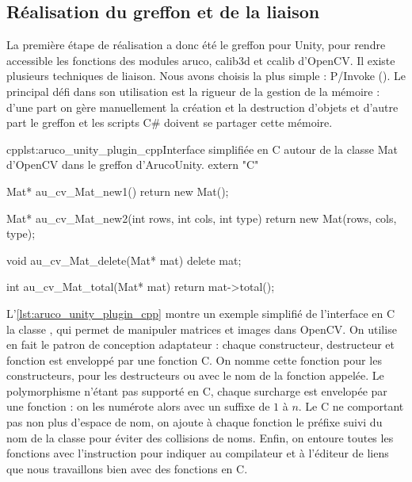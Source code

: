 \subsection{Réalisation du greffon et de la liaison}
La première étape de réalisation a donc été le greffon pour Unity, pour rendre accessible les fonctions des modules aruco, calib3d et ccalib d'OpenCV. Il existe plusieurs techniques de liaison. Nous avons choisis la plus simple : P/Invoke (). Le principal défi dans son utilisation est la rigueur de la gestion de la mémoire : d'une part on gère manuellement la création et la destruction d'objets et d'autre part le greffon et les scripts C\# doivent se partager cette mémoire.

\begin{listingETS}{cpp}{lst:aruco_unity_plugin_cpp}{Interface simplifiée en C autour de la classe Mat d'OpenCV dans le greffon d'ArucoUnity.}
  extern "C" {
    Mat* au_cv_Mat_new1() {
      return new Mat();
    }

    Mat* au_cv_Mat_new2(int rows, int cols, int type) {
      return new Mat(rows, cols, type);
    }
    
    void au_cv_Mat_delete(Mat* mat) {
      delete mat;
    }

    int au_cv_Mat_total(Mat* mat) {
      return mat->total();
    }
  }
\end{listingETS}

L'\autoref{lst:aruco_unity_plugin_cpp} montre un exemple simplifié de l'interface en C la classe , qui permet de manipuler matrices et images dans OpenCV. On utilise en fait le patron de conception adaptateur : chaque constructeur, destructeur et fonction est enveloppé par une fonction C. On nomme cette fonction  pour les constructeurs,  pour les destructeurs ou avec le nom de la fonction appelée. Le polymorphisme n'étant pas supporté en C, chaque surcharge est envelopée par une fonction : on les numérote alors avec un suffixe de $1$ à $n$. Le C ne comportant pas non plus d'espace de nom, on ajoute à chaque fonction le préfixe  suivi du nom de la classe pour éviter des collisions de noms. Enfin, on entoure toutes les fonctions avec l'instruction  pour indiquer au compilateur et à l'éditeur de liens que nous travaillons bien avec des fonctions en C.

